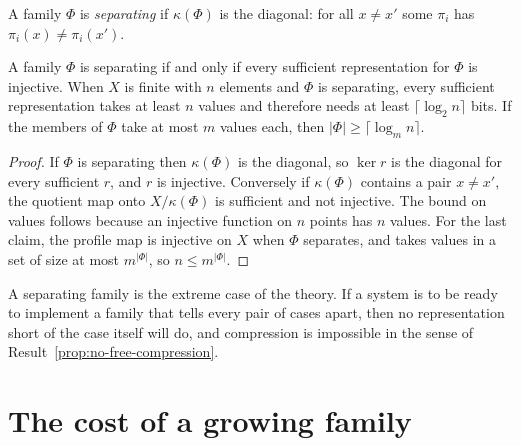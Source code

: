 \begin{definition}\label{def:separating}
A family $\Phi$ is \emph{separating} if $\kappa(\Phi)$ is the diagonal: for all $x\ne x'$ some $\pi_i$ has $\pi_i(x)\ne\pi_i(x')$.
\end{definition}

\begin{newresult}\label{thm:separating}
A family $\Phi$ is separating if and only if every sufficient representation for $\Phi$ is injective. When $X$ is finite with $n$ elements and $\Phi$ is separating, every sufficient representation takes at least $n$ values and therefore needs at least $\lceil\log_2 n\rceil$ bits. If the members of $\Phi$ take at most $m$ values each, then $|\Phi|\ge\lceil\log_m n\rceil$.
\end{newresult}
\begin{proof}
If $\Phi$ is separating then $\kappa(\Phi)$ is the diagonal, so $\ker r$ is the diagonal for every sufficient $r$, and $r$ is injective. Conversely if $\kappa(\Phi)$ contains a pair $x\ne x'$, the quotient map onto $X/\kappa(\Phi)$ is sufficient and not injective. The bound on values follows because an injective function on $n$ points has $n$ values. For the last claim, the profile map is injective on $X$ when $\Phi$ separates, and takes values in a set of size at most $m^{|\Phi|}$, so $n\le m^{|\Phi|}$.
\end{proof}

A separating family is the extreme case of the theory. If a system is to be ready to implement a family that tells every pair of cases apart, then no representation short of the case itself will do, and compression is impossible in the sense of Result~\ref{prop:no-free-compression}.

\section{The cost of a growing family}

